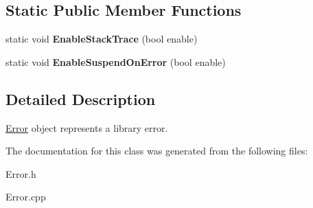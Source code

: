 \subsection*{Static Public Member Functions}
\begin{DoxyCompactItemize}
\item 
\hypertarget{classError_a38b410fa32e0365bcd6dd682e207f86a}{
static void {\bfseries EnableStackTrace} (bool enable)}
\label{classError_a38b410fa32e0365bcd6dd682e207f86a}

\item 
\hypertarget{classError_a2ab6731cd4059176d321bd30b9f8968d}{
static void {\bfseries EnableSuspendOnError} (bool enable)}
\label{classError_a2ab6731cd4059176d321bd30b9f8968d}

\end{DoxyCompactItemize}


\subsection{Detailed Description}
\hyperlink{classError}{Error} object represents a library error. 

The documentation for this class was generated from the following files:\begin{DoxyCompactItemize}
\item 
Error.h\item 
Error.cpp\end{DoxyCompactItemize}
